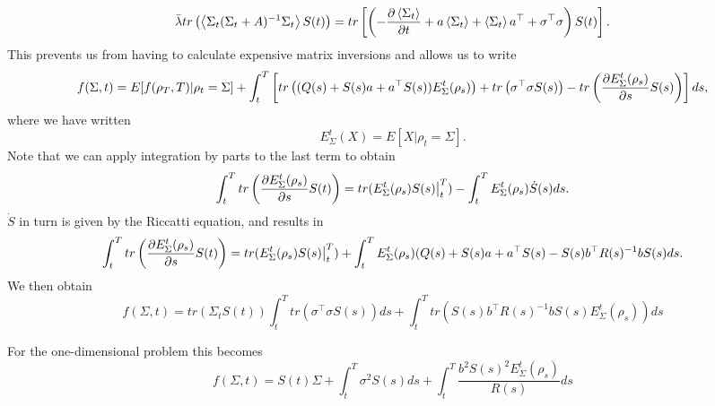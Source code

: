 \[
\bar{\lambda} tr\left(\left<\Sigma_t(\Sigma_t + A)^{-1} \Sigma_t\right>S(t)\right) = tr\left[\left(-\frac{\partial \left<\Sigma_t\right>}{\partial t} + a \left<\Sigma_t\right> + \left<\Sigma_t\right> a^\top + \sigma^\top\sigma\right)S(t)\right]. 
\]
This prevents us from having to calculate expensive matrix inversions and allows us to write
\[
f(\Sigma,t) =E[f(\rho_T,T)|\rho_t=\Sigma] + \int_t^T\left[ tr\left((Q(s)+S(s)a + a^\top S(s))E^t_{\Sigma}(\rho_s)\right) +tr\left(\sigma^\top \sigma S(s)\right)-tr\left( \frac{\partial E^t_\Sigma(\rho_s)}{\partial s} S(s)\right)\right]ds,
\]
where we have written
\[
E^t_\Sigma(X) = E[X|\rho_t=\Sigma].
\]
Note that we can apply integration by parts to the last term to obtain
\[
\int_t^T tr\left( \frac{\partial E^t_\Sigma(\rho_s)}{\partial s} S(t)\right) = tr(E^t_\Sigma(\rho_s) S(s)\big|_t^T) - \int_t^T E^t_\Sigma(\rho_s) \dot{S}(s)ds.
\]
$\dot{S}$ in turn is given by the Riccatti equation, and results in
\[
\int_t^T tr\left( \frac{\partial E^t_\Sigma(\rho_s)}{\partial s} S(t)\right) =  tr(E^t_\Sigma(\rho_s) S(s)\big|_t^T) + \int_t^T E^t_\Sigma(\rho_s) (Q(s) + S(s) a + a^\top S(s) -S(s) b^\top R(s)^{-1} b S(s)ds.
\]
We then obtain
\[
f(\Sigma,t)  = tr\left(\Sigma_t S(t)\right) \int_t^T tr\left(\sigma^\top\sigma S(s)\right)ds+ \int_t^T tr \left(S(s) b^\top R(s)^{-1}b S(s) E^t_\Sigma(\rho_s)\right) ds
\]

For the one-dimensional problem this becomes
\[
f(\Sigma,t) = S(t) \Sigma + \int_t^T \sigma^2 S(s) ds +\int_t^T \frac{b^2 S(s)^2 E^t_\Sigma(\rho_s)}{R(s)}ds 
\]

